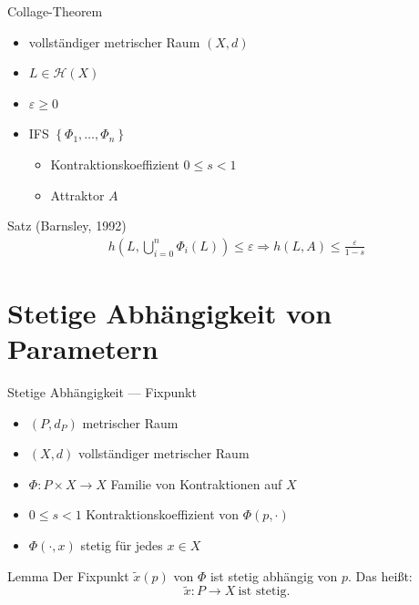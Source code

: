 \documentclass[10pt]{beamer}
\renewcommand{\tilde}[1]{\widetilde{#1}}
\let\epsilon\varepsilon
\begin{document}
\begin{frame}{Collage-Theorem}
  \begin{itemize}
    \item vollständiger metrischer Raum \( (X,d) \)
    \item \( L \in \mathcal{H}(X) \)
    \item \( \epsilon \geq 0 \)
    \item IFS \( \left \{ \Phi_1,\dots,\Phi_n \right \} \)
    \begin{itemize}
      \item Kontraktionskoeffizient \( 0 \leq s < 1 \) 
      \item Attraktor \( A \)
    \end{itemize}
  \end{itemize}

  \begin{block}{Satz (Barnsley, 1992)}
    \begin{align*}
      h\left( L,\bigcup_{i=0}^n \Phi_i(L) \right) \leq \epsilon \Rightarrow h(L,A) \leq \frac{\epsilon}{1 - s}
    \end{align*}
  \end{block}
\end{frame}

\section{Stetige Abhängigkeit von Parametern}

\begin{frame}{Stetige Abhängigkeit --- Fixpunkt}
  \begin{itemize}
    \item \( (P, d_P) \) metrischer Raum
    \item \( (X,d) \) vollständiger metrischer Raum
    \item \( \Phi: P \times X \to X \) Familie von Kontraktionen auf \( X \)
    \item \( 0 \leq s < 1 \) Kontraktionskoeffizient von \( \Phi(p, \cdot) \)
    \item \( \Phi(\cdot, x) \) stetig für jedes \( x \in X \)
  \end{itemize}
  \begin{block}{Lemma}
    Der Fixpunkt \( \tilde{x}(p) \) von \( \Phi \) ist stetig abhängig von \( p \). Das heißt:
    \begin{equation*}
      \tilde{x} : P \to X \ \text{ist stetig.}
    \end{equation*}
  \end{block}
\end{frame}
\end{document}
